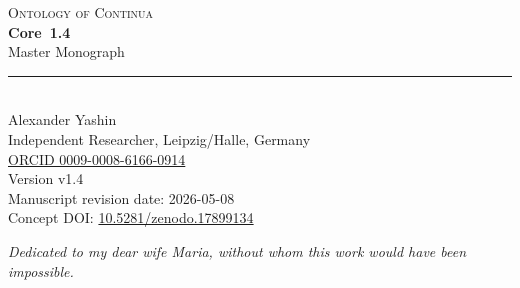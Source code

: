 \begin{titlepage}
\label{sec:oc133-title-page}
\thispagestyle{empty}
\begin{center}
\vspace*{1.0cm}
{\sffamily\Large\color{ocTitleBlue}\textsc{Ontology of Continua}}\\[0.38cm]
{\sffamily\Huge\bfseries Core~1.4}\\[0.28cm]
{\sffamily\Large Master Monograph}\\[0.75cm]
{\color{ocTitleGold}\rule{0.42\textwidth}{0.5pt}}\\[0.95cm]

{\Large Alexander Yashin}\\[0.2cm]
{\normalsize Independent Researcher, Leipzig/Halle, Germany}\\[0.2cm]
{\normalsize \href{https://orcid.org/0009-0008-6166-0914}{ORCID 0009-0008-6166-0914}}\\[1.0cm]

{\normalsize Version v1.4}\\[0.3cm]
{\normalsize Manuscript revision date: 2026-05-08}\\[0.3cm]
{\normalsize Concept DOI: \href{https://doi.org/10.5281/zenodo.17899134}{10.5281/zenodo.17899134}}\\[0.9cm]

\vfill

{\small\itshape Dedicated to my dear wife Maria, without whom this work would have been impossible.}\\[0.8cm]
\end{center}
\end{titlepage}

